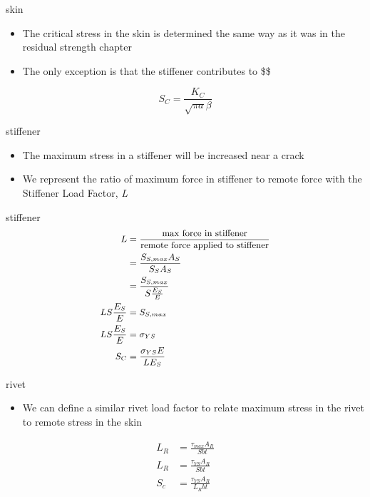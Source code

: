 \documentclass[
  letterpaper,
  ignorenonframetext,
  aspectratio=43,
  handout,
  12pt]{beamer}
\providecommand{\tightlist}{%
  \setlength{\itemsep}{0pt}\setlength{\parskip}{0pt}}
\providecommand{\tightlist}{%
\setlength{\itemsep}{0pt}\setlength{\parskip}{0pt}}
\begin{document}
\begin{frame}{skin}
\protect\hypertarget{skin}{}
\begin{itemize}
\tightlist
\item
  The critical stress in the skin is determined the same way as it was
  in the residual strength chapter
\item
  The only exception is that the stiffener contributes to \$\beta\$
\end{itemize}

\[S_C = \frac{K_C}{\sqrt{\pi a} \beta}\]
\end{frame}

\begin{frame}{stiffener}
\protect\hypertarget{stiffener}{}
\begin{itemize}
\tightlist
\item
  The maximum stress in a stiffener will be increased near a crack
\item
  We represent the ratio of maximum force in stiffener to remote force
  with the Stiffener Load Factor, \emph{L}
\end{itemize}
\end{frame}

\begin{frame}{stiffener}
\protect\hypertarget{stiffener-1}{}
\[\small{\begin{aligned}
  L &= \frac{\text{max force in stiffener}}{\text{remote force applied to stiffener}}\\
  &= \frac{S_{S,max}A_S}{S_S A_S}\\
  &= \frac{S_{S,max}}{S \frac{E_S}{E}}\\
  L S \frac{E_S}{E} &= S_{S,max}\\
  L S \frac{E_S}{E} &= \sigma_{YS}\\
  S_C &= \frac{\sigma_{YS} E}{L E_S}
\end{aligned}}\]
\end{frame}

\begin{frame}{rivet}
\protect\hypertarget{rivet}{}
\begin{itemize}
\tightlist
\item
  We can define a similar rivet load factor to relate maximum stress in
  the rivet to remote stress in the skin
\end{itemize}

\[\begin{aligned}
  L_R &= \frac{\tau_{max} A_R}{S b t}\\
  L_R &= \frac{\tau_{YS} A_R}{S b t}\\
  S_c &= \frac{\tau_{YS} A_R}{L_R b t}
\end{aligned}\]
\end{frame}
\end{document}
